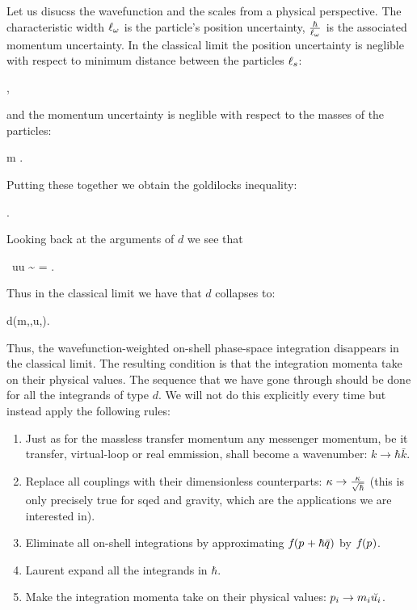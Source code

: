 \documentclass[
  11pt,
  a4paper,
  DIV=11,
  numbers=noendperiod,
  twoside]{scrreprt}
\providecommand{\tightlist}{%
  \setlength{\itemsep}{0pt}\setlength{\parskip}{0pt}}\usepackage{longtable,booktabs,array}
\let\[\relax \let\]\relax %
\DeclareRobustCommand{\[}{\begin{equation}}
\DeclareRobustCommand{\]}{\end{equation}}
\begin{document}
Let us disucss the wavefunction and the scales from a physical
perspective. The characteristic width \(\wfwidth\) is the particle's
position uncertainty, \(\frac{\hbar}{\wfwidth}\) is the associated
momentum uncertainty. In the classical limit the position uncertainty is
neglible with respect to minimum distance between the particles
\(\scatlen\):

\[
\wfwidth\ll \scatlen,
\]

and the momentum uncertainty is neglible with respect to the masses of
the particles:

\[
\frac{\hbar}{\wfwidth}\ll m \implies \comptlen\ll \wfwidth.
\]

Putting these together we obtain the goldilocks inequality:

\[
\comptlen\ll\wfwidth\ll\scatlen.
\]

Looking back at the arguments of \(d\) we see that

\[
\scatlen\, \tw \cdot u\gg\wfwidth \tw \cdot u \sim \sqrt{\xi} =   \frac{\comptlen}{\wfwidth}\gg\frac{\comptlen}{\scatlen}.
\]

Thus in the classical limit we have that \(d\) collapses to:

\[
d(m,\xi,u,\tm)\propto{}.
\]

Thus, the wavefunction-weighted on-shell phase-space integration
disappears in the classical limit. The resulting condition is that the
integration momenta take on their physical values. The sequence that we
have gone through should be done for all the integrands of type \(d\).
We will not do this explicitly every time but instead apply the
following rules:

\begin{enumerate}
\def\labelenumi{\arabic{enumi}.}
\tightlist
\item
  Just as for the massless transfer momentum any messenger momentum, be
  it transfer, virtual-loop or real emmission, shall become a
  wavenumber: \(k\to \hbar \bar{k}\).
\item
  Replace all couplings with their dimensionless counterparts:
  \(\coupling\to \frac{\coupling}{\sqrt{\hbar} }\) (this is only
  precisely true for \gls{sqed} and gravity, which are the applications
  we are interested in).
\item
  Eliminate all on-shell integrations by approximating
  \(\wf(\emom+\hbar\tw)\) by \(\wf(\emom)\).
\item
  Laurent expand all the integrands in \(\hbar\).
\item
  Make the integration momenta take on their physical values:
  \(\emom[i]\to \mass[i]\cls{\vel[i]}\).
\end{enumerate}
\end{document}
